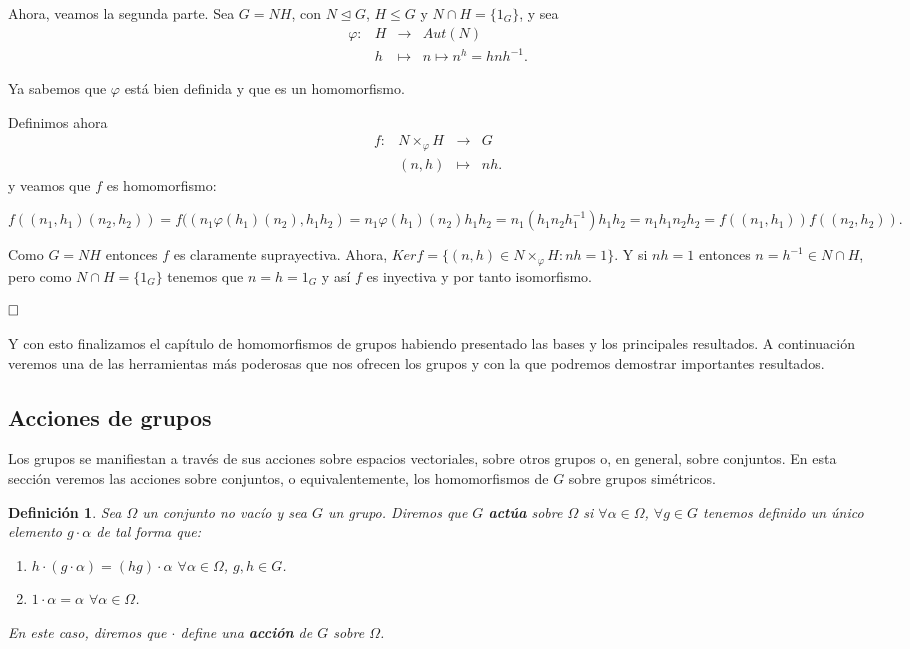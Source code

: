 \documentclass[12pt]{article}
\newtheorem{definition}[theorem]{Definición}
\begin{document}
Ahora, veamos la segunda parte. Sea $G=NH$, con $N \unlhd G$, $H\leq G$ y $N \cap H = \lbrace 1_{G} \rbrace$, y sea 
$$\begin{array}{rccl}
\varphi\colon &H & \longrightarrow & Aut(N)\\
&h& \longmapsto &n \longmapsto n^{h} = hnh^{-1}.
\end{array}
$$

Ya sabemos que $\varphi$ está bien definida y que es un homomorfismo.

Definimos ahora $$\begin{array}{rccl}
f\colon &N \times _{\varphi} H & \longrightarrow & G\\
&(n,h)& \longmapsto &nh.
\end{array}
$$
y veamos que $f$ es homomorfismo: \begin{center}$f((n_{1},h_{1})(n_{2},h_{2}))=f((n_{1}\varphi(h_{1})(n_{2}),h_{1}h_{2})=n_{1}\varphi(h_{1})(n_{2})h_{1}h_{2}=n_{1}(h_{1}n_2h_{1}^{-1})h_{1}h_{2}=n_{1}h_{1}n_{2}h_{2}=f((n_{1},h_{1}))f((n_{2},h_{2})).$\end{center}

Como $G=NH$ entonces $f$ es claramente suprayectiva. Ahora, $Ker f= \lbrace (n,h) \in N\times_{\varphi} H :nh=1 \rbrace$. Y si $nh=1$ entonces $n=h^{-1}\in N \cap H$, pero como $N \cap H = \lbrace 1_{G} \rbrace$ tenemos que $n=h=1_{G}$ y así $f$ es inyectiva y por tanto isomorfismo.

$\hfill \square$

Y con esto finalizamos el capítulo de homomorfismos de grupos habiendo presentado las bases y los principales resultados. A continuación veremos una de las herramientas más poderosas que nos ofrecen los grupos y con la que podremos demostrar importantes resultados.

\subsection{Acciones de grupos}

Los grupos se manifiestan a través de sus acciones sobre espacios vectoriales, sobre otros grupos o, en general, sobre conjuntos. En esta sección veremos las acciones sobre conjuntos, o equivalentemente, los homomorfismos de $G$ sobre grupos simétricos.

\begin{definition}Sea $\Omega$ un conjunto no vacío y sea $G$ un grupo. Diremos que $G$ \textbf{actúa} sobre $\Omega$ si $\forall \alpha \in \Omega$, $\forall g \in G$ tenemos definido un único elemento $g \cdot \alpha$ de tal forma que:
\begin{enumerate}
\item $h \cdot (g \cdot \alpha)=(hg) \cdot \alpha$ $\forall \alpha \in \Omega$, $g,h \in G$.
\item $1 \cdot \alpha =\alpha$ $\forall \alpha \in \Omega$.
\end{enumerate}

En este caso, diremos que $\cdot$ define una \textbf{acción} de $G$ sobre $\Omega$.
\end{definition}
\end{document}
